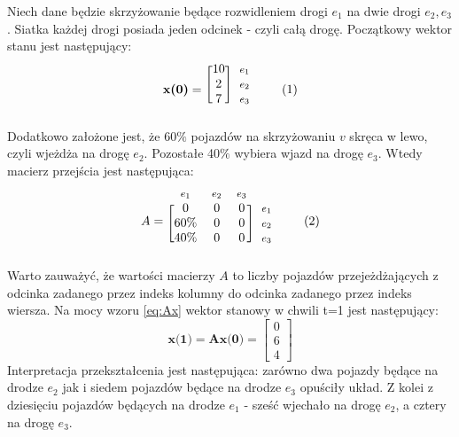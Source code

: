\documentclass[12pt]{book}
\theoremstyle{plain}
\newcommand\addtag{\refstepcounter{equation}
\renewcommand{\labelenumii}{\theenumii}
\renewcommand{\theenumii}{\theenumi.\arabic{enumii}.}
\tag{\theequation}}
\begin{document}
Niech dane będzie skrzyżowanie będące rozwidleniem drogi $e_1$ na dwie drogi $e_2,e_3$. Siatka każdej drogi posiada jeden odcinek - czyli całą drogę. Początkowy wektor stanu jest następujący:
\begin{equation*}
\textbf{x(0)}=
\begin{blockarray}{*{1}{c} l}
\begin{block}{*{1}{>{$\footnotesize}c<{$}} l}
\end{block}
\begin{block}{[*{1}{c}]>{$\footnotesize}l<{$}}
10 &  $e_1$ \\
2 &  $e_2$ \\
7 &  $e_3$ \\
\end{block}
\end{blockarray} \addtag
\end{equation*}
Dodatkowo założone jest, że 60$\%$ pojazdów na skrzyżowaniu $v$ skręca w lewo, czyli wjeżdża na drogę $e_2$. Pozostałe 40$\%$ wybiera wjazd na drogę $e_3$.
Wtedy macierz przejścia jest następująca:
\begin{equation*}
A=
\begin{blockarray}{*{3}{c} l}
\begin{block}{*{3}{>{$\footnotesize}c<{$}} l}
$e_1$ & $e_2$ & $e_3$\\
\end{block}
\begin{block}{[*{3}{c}]>{$\footnotesize}l<{$}}
0 & 0 & 0 & $e_1$ \\
60$\%$ & 0 & 0 & $e_2$ \\
40$\%$ & 0 & 0 & $e_3$ \\
\end{block}
\end{blockarray} \addtag
\end{equation*}
Warto zauważyć, że wartości macierzy $A$ to liczby pojazdów przejeżdżających z odcinka zadanego przez indeks kolumny do odcinka zadanego przez indeks wiersza.
Na mocy wzoru \ref{eq:Ax} wektor stanowy w chwili t=1 jest następujący:
\[
\textbf{x(1)}=\textbf{Ax(0)}=\begin{bmatrix}
0 \\ 6 \\ 4
\end{bmatrix}
\]
Interpretacja przekształcenia jest następująca: zarówno dwa pojazdy będące na drodze $e_2$ jak i siedem pojazdów będące na drodze $e_3$ opuściły układ. Z kolei z dziesięciu pojazdów będących na drodze $e_1$ - sześć wjechało na drogę $e_2$, a cztery na drogę $e_3$.
\end{document}
